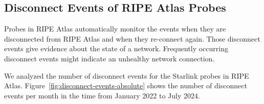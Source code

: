\subsection{Disconnect Events of RIPE Atlas Probes} \label{sec:disconnect-events}

Probes in RIPE Atlas automatically monitor the events when they are
disconnected from RIPE Atlas and when they re-connect again. Those disconnect
events give evidence about the state of a network. Frequently occurring
disconnect events might indicate an unhealthy network connection.

We analyzed the number of disconnect events for the Starlink probes in RIPE
Atlas. Figure~\ref{fig:disconnect-events-absolute} shows the number of
disconnect events per month in the time from January 2022 to July 2024.

